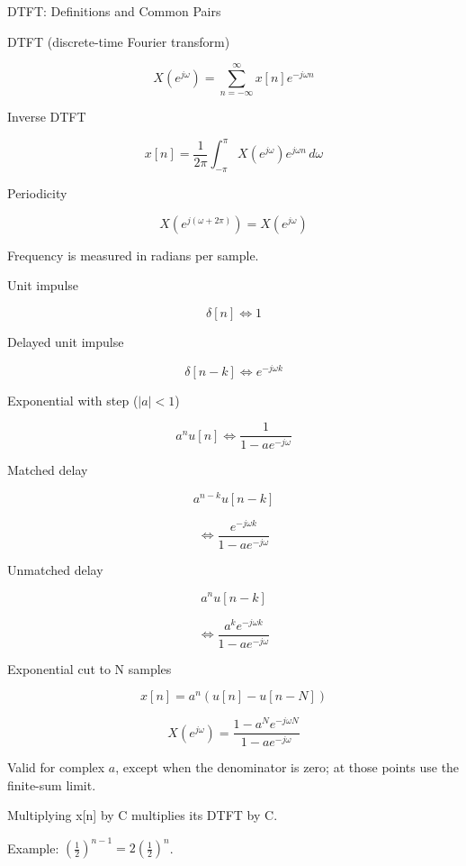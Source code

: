 DTFT: Definitions and Common Pairs

DTFT (discrete-time Fourier transform)

$$X(e^{j\omega})=\sum_{n=-\infty}^{\infty}x[n]e^{-j\omega n}$$

Inverse DTFT

$$x[n]=\frac{1}{2\pi}\int_{-\pi}^{\pi}X(e^{j\omega})e^{j\omega n}\,d\omega$$

Periodicity

$$X(e^{j(\omega+2\pi)})=X(e^{j\omega})$$

Frequency is measured in radians per sample.

Unit impulse

$$\delta[n]\Leftrightarrow 1$$

Delayed unit impulse

$$\delta[n-k]\Leftrightarrow e^{-j\omega k}$$

Exponential with step ($|a|<1$)

$$a^n u[n]\Leftrightarrow\frac{1}{1-ae^{-j\omega}}$$

Matched delay

$$a^{n-k}u[n-k]$$

$$\Leftrightarrow\frac{e^{-j\omega k}}{1-ae^{-j\omega}}$$

Unmatched delay

$$a^n u[n-k]$$

$$\Leftrightarrow\frac{a^k e^{-j\omega k}}{1-ae^{-j\omega}}$$

Exponential cut to N samples

$$x[n]=a^n(u[n]-u[n-N])$$

$$X(e^{j\omega})=\frac{1-a^Ne^{-j\omega N}}{1-ae^{-j\omega}}$$

Valid for complex $a$, except when the denominator is zero; at those points use the finite-sum limit.

Multiplying x[n] by C multiplies its DTFT by C.

Example: $\left(\frac12\right)^{n-1}=2\left(\frac12\right)^n$.
